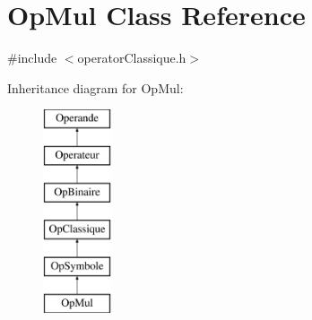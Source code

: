 \hypertarget{class_op_mul}{}\section{Op\+Mul Class Reference}
\label{class_op_mul}


{\ttfamily \#include $<$operator\+Classique.\+h$>$}

Inheritance diagram for Op\+Mul\+:\begin{figure}[H]
\begin{center}
\leavevmode
\includegraphics[height=6.000000cm]{class_op_mul}
\end{center}
\end{figure}
